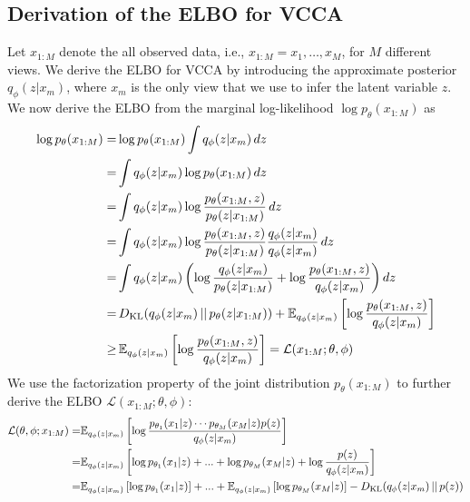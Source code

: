 
\subsection*{Derivation of the ELBO for VCCA}
\label{paperB:app:derivation_of_elbo_for_vcca}

Let $x_{1:M}$ denote the all observed data, i.e., $x_{1:M} = x_1, \dots, x_M$, for $M$ different views. We derive the ELBO for VCCA by introducing the approximate posterior $q_{\phi}(z | x_m)$, where $x_m$ is the only view that we use to infer the latent variable $z$. We now derive the ELBO from the marginal log-likelihood $ \log p_{{\theta}}(x_{1:M})$ as 
\begin{align*}
    \begin{split}
        \log p_{{\theta}}(x_{1:M}) = & \log p_{{\theta}}(x_{1:M}) \int q_{\phi}(z | x_m) \, dz \\
        = & \int q_{\phi}(z | x_m) \log p_{{\theta}}(x_{1:M}) \, dz \\
        = & \int q_{\phi}(z | x_m) \log \frac{p_{{\theta}}(x_{1:M}, z)}{p_{{\theta}}(z | x_{1:M})}  \, dz \\
        = & \int q_{\phi}(z | x_m) \log \frac{p_{{\theta}}(x_{1:M}, z)}{p_{{\theta}}(z | x_{1:M})} \frac{q_{\phi}(z | x_m)}{q_{\phi}(z | x_m)}  \, dz \\
        = & \int q_{\phi}(z | x_m) \left( \log \frac{q_{\phi}(z | x_m)}{p_{{\theta}}(z | x_{1:M})} + \log \frac{p_{{\theta}}(x_{1:M}, z)}{q_{\phi}(z | x_m)} \right) dz \\
        = & \, D_{\mathrm{KL}}(q_{\phi}(z | x_m) \,||\, p_{{\theta}}(z | x_{1:M})) + \mathbb{E}_{q_{\phi}(z | x_m)}\left[ \log \frac{p_{{\theta}}(x_{1:M}, z)}{q_{\phi}(z | x_m)} \right] \\
        \geq & \, \mathbb{E}_{q_{\phi}(z | x_m)}\left[ \log \frac{p_{{\theta}}(x_{1:M}, z)}{q_{\phi}(z | x_m)} \right] = \mathcal{L}(x_{1:M}; \theta, \phi)
    \end{split}
\end{align*}
We use the factorization property of the joint distribution $p_{\theta}(x_{1:M})$ to further derive the ELBO $\mathcal{L}(x_{1:M}; \theta, \phi)$:
\begin{align*}
    \begin{split}
        \mathcal{L}(\theta, \phi; x_{1:M}) = & \mathbb{E}_{q_{\phi}(z | x_m)}\left[ \log \frac{p_{{\theta}_1}(x_1 |  z) \cdots p_{{\theta}_M}(x_M |  z) p(z)}{q_{\phi}(z | x_m)} \right] \\
        = & \mathbb{E}_{q_{\phi}(z | x_m)}\left[ \log p_{{\theta}_1}(x_1 |  z) + ... + \log p_{{\theta}_M}(x_M |  z) + \log \frac{p(z)}{q_{\phi}(z | x_m)} \right] \\
        = & \mathbb{E}_{q_{\phi}(z | x_m)}\left[ \log p_{{\theta}_1}(x_1 |  z) \right] + ... + \mathbb{E}_{q_{\phi}(z | x_m)}\left[ \log p_{{\theta}_M}(x_M |  z) \right] -D_{\mathrm{KL}}(q_{\phi}(z | x_m) \,||\, p(z))
    \end{split}
\end{align*}
